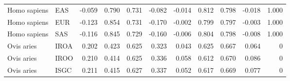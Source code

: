 \begin{center}
\begin{adjustbox}{width = 1\textwidth}
\begin{tabular}{llrrrrrrrrr}
        Homo sapiens &                       EAS &                             -0.059 &                               0.790 &                 0.731 &                -0.082 &                             -0.014 &                               0.812 &                 0.798 &                -0.018 &         1.000 \\
        Homo sapiens &                       EUR &                             -0.123 &                               0.854 &                 0.731 &                -0.170 &                             -0.002 &                               0.799 &                 0.797 &                -0.003 &         1.000 \\
        Homo sapiens &                       SAS &                             -0.116 &                               0.845 &                 0.729 &                -0.160 &                             -0.006 &                               0.804 &                 0.798 &                -0.008 &         1.000 \\
          Ovis aries &                      IROA &                              0.202 &                               0.423 &                 0.625 &                 0.323 &                              0.043 &                               0.625 &                 0.667 &                 0.064 &             0 \\
          Ovis aries &                      IROO &                              0.210 &                               0.414 &                 0.625 &                 0.336 &                              0.058 &                               0.612 &                 0.670 &                 0.086 &             0 \\
          Ovis aries &                      ISGC &                              0.211 &                               0.415 &                 0.627 &                 0.337 &                              0.052 &                               0.617 &                 0.669 &                 0.077 &             0 \\
\bottomrule
\end{tabular}
\end{adjustbox}
\end{center}
